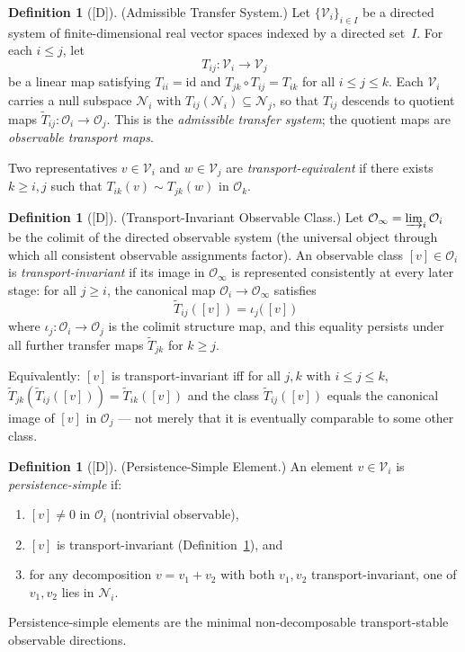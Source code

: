 \documentclass[12pt,oneside]{amsbook}
\theoremstyle{plain}
\theoremstyle{definition}
\newtheorem{definition}[theorem]{Definition}
\theoremstyle{remark}
\newcommand{\status}[1]{\textup{[#1]}}
\begin{document}
\begin{definition}[\status{D}]\label{def:transfer-system}
\textup{(Admissible Transfer System.)}
Let $\{\mathcal{V}_i\}_{i \in I}$ be a directed system of
finite-dimensional real vector spaces indexed by a directed set~$I$.
For each $i \leq j$, let
\[
  T_{ij} : \mathcal{V}_i \to \mathcal{V}_j
\]
be a linear map satisfying $T_{ii} = \mathrm{id}$ and
$T_{jk} \circ T_{ij} = T_{ik}$ for all $i \leq j \leq k$.
Each $\mathcal{V}_i$ carries a null subspace $\mathcal{N}_i$ with
$T_{ij}(\mathcal{N}_i) \subseteq \mathcal{N}_j$, so that $T_{ij}$
descends to quotient maps
$\widetilde{T}_{ij} : \mathcal{O}_i \to \mathcal{O}_j$.
This is the \emph{admissible transfer system}; the quotient maps are
\emph{observable transport maps}.

Two representatives $v \in \mathcal{V}_i$ and $w \in \mathcal{V}_j$
are \emph{transport-equivalent} if there exists $k \geq i,j$ such that
$T_{ik}(v) \sim T_{jk}(w)$ in $\mathcal{O}_k$.
\end{definition}

\begin{definition}[\status{D}]\label{def:transport-invariant}
\textup{(Transport-Invariant Observable Class.)}
Let $\mathcal{O}_\infty = \varinjlim_i \mathcal{O}_i$ be the
colimit of the directed observable system (the universal object
through which all consistent observable assignments factor).
An observable class $[v] \in \mathcal{O}_i$ is
\emph{transport-invariant} if its image in $\mathcal{O}_\infty$
is represented consistently at every later stage: for all
$j \geq i$, the canonical map $\mathcal{O}_i \to \mathcal{O}_\infty$
satisfies
\[
  \widetilde{T}_{ij}([v]) = \iota_j\!\bigl(\,[v]\,\bigr)
\]
where $\iota_j : \mathcal{O}_i \to \mathcal{O}_j$ is the
colimit structure map, and this equality persists under all
further transfer maps $\widetilde{T}_{jk}$ for $k \geq j$.

Equivalently: $[v]$ is transport-invariant iff for all $j, k$
with $i \leq j \leq k$,
$\widetilde{T}_{jk}(\widetilde{T}_{ij}([v])) =
\widetilde{T}_{ik}([v])$
and the class $\widetilde{T}_{ij}([v])$ equals the canonical
image of $[v]$ in $\mathcal{O}_j$ — not merely that it is
eventually comparable to some other class.
\end{definition}

\begin{definition}[\status{D}]\label{def:persistence-simple}
\textup{(Persistence-Simple Element.)}
An element $v \in \mathcal{V}_i$ is \emph{persistence-simple} if:
\begin{enumerate}[label=\textup{(\roman*)}]
  \item $[v] \neq 0$ in $\mathcal{O}_i$ (nontrivial observable),
  \item $[v]$ is transport-invariant
    (Definition~\ref{def:transport-invariant}), and
  \item for any decomposition $v = v_1 + v_2$ with both $v_1, v_2$
    transport-invariant, one of $v_1, v_2$ lies in $\mathcal{N}_i$.
\end{enumerate}
Persistence-simple elements are the minimal non-decomposable
transport-stable observable directions.
\end{definition}
\end{document}
